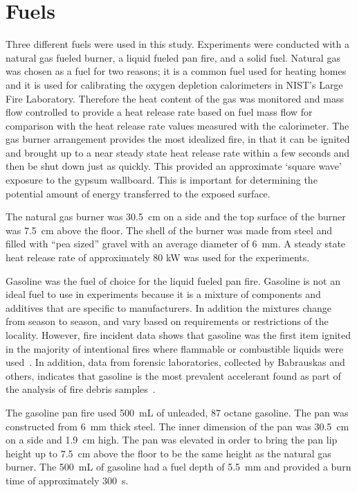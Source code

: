 \documentclass[twoside]{uocthesis}
\begin{document}
{\section{Fuels}

Three different fuels were used in this study.  Experiments were conducted with a natural gas fueled burner, a liquid fueled pan fire, and a solid fuel. Natural gas was chosen as a fuel for two reasons; it is a common fuel used for heating homes and it is used for calibrating the oxygen depletion calorimeters in NIST’s Large Fire Laboratory.  Therefore the heat content of the gas was monitored and mass flow controlled to provide a heat release rate based on fuel mass flow for comparison with the heat release rate values measured with the calorimeter.  The gas burner arrangement provides the most idealized fire, in that it can be ignited and brought up to a near steady state heat release rate within a few seconds and then be shut down just as quickly.  This provided an approximate `square wave' exposure to the gypsum wallboard.  This is important for determining the potential amount of energy transferred to the exposed surface.

The natural gas burner was 30.5~cm on a side and the top surface of the burner was 7.5~cm above the floor. The shell of the burner was made from steel and filled with ``pea sized'' gravel with an average diameter of 6~mm.  A steady state heat release rate of approximately 80 kW was used for the experiments.

Gasoline was the fuel of choice for the liquid fueled pan fire.  Gasoline is not an ideal fuel to use in experiments because it is a mixture of components and additives that are specific to manufacturers. In addition the mixtures change from season to season, and vary based on requirements or restrictions of the locality.  However, fire incident data shows that gasoline was the first item ignited in the majority of intentional fires where flammable or combustible liquids were used~\cite{Rohr:2001}. In addition, data from forensic laboratories, collected by Babrauskas and others, indicates that gasoline is the most prevalent accelerant found as part of the analysis of fire debris samples~\cite{Babrauskas:2003,Chasteen:2010}.

The gasoline pan fire used 500~mL of unleaded, 87 octane gasoline.  The pan was constructed from 6~mm thick steel.  The inner dimension of the pan was 30.5~cm on a side and 1.9~cm high.  The pan was elevated in order to bring the pan lip height up to 7.5~cm above the floor to be the same height as the natural gas burner.  The 500~mL of gasoline had a fuel depth of 5.5~mm and provided a burn time of approximately 300~s.

}
\end{document}
